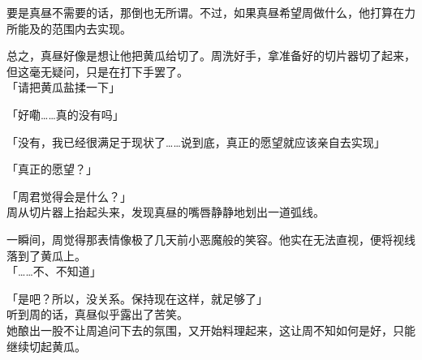 要是真昼不需要的话，那倒也无所谓。不过，如果真昼希望周做什么，他打算在力所能及的范围内去实现。

总之，真昼好像是想让他把黄瓜给切了。周洗好手，拿准备好的切片器切了起来，但这毫无疑问，只是在打下手罢了。\\

「请把黄瓜盐揉一下」

「好嘞……真的没有吗」

「没有，我已经很满足于现状了……说到底，真正的愿望就应该亲自去实现」

「真正的愿望？」

「周君觉得会是什么？」\\

周从切片器上抬起头来，发现真昼的嘴唇静静地划出一道弧线。

一瞬间，周觉得那表情像极了几天前小恶魔般的笑容。他实在无法直视，便将视线落到了黄瓜上。\\

「……不、不知道」

「是吧？所以，没关系。保持现在这样，就足够了」\\

听到周的话，真昼似乎露出了苦笑。\\

她酿出一股不让周追问下去的氛围，又开始料理起来，这让周不知如何是好，只能继续切起黄瓜。

